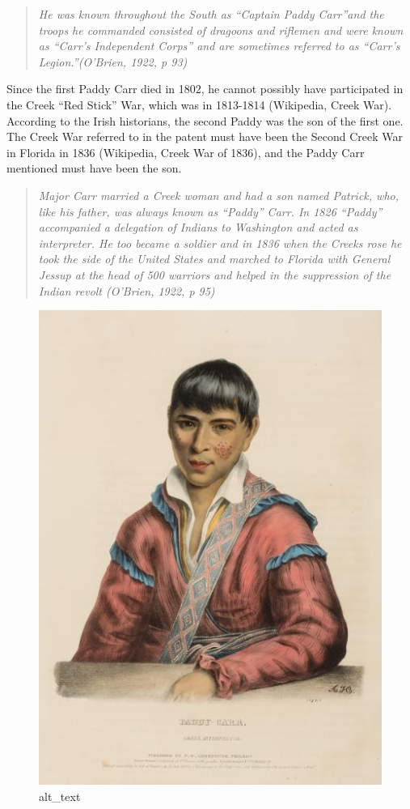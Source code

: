 \documentclass[
  12pt,
]{book}
\begin{document}
\begin{quote}
\emph{He was known throughout the South as ``Captain Paddy Carr''and the troops he commanded consisted of dragoons and riflemen and were known as ``Carr's Independent Corps'' and are sometimes referred to as ``Carr's Legion.''(O'Brien, 1922, p 93)}
\end{quote}

Since the first Paddy Carr died in 1802, he cannot possibly have participated in the Creek ``Red Stick'' War, which was in 1813-1814 (Wikipedia, Creek War). According to the Irish historians, the second Paddy was the son of the first one. The Creek War referred to in the patent must have been the Second Creek War in Florida in 1836 (Wikipedia, Creek War of 1836), and the Paddy Carr mentioned must have been the son.

\begin{quote}
\emph{Major Carr married a Creek woman and had a son named Patrick, who, like his father, was always known as ``Paddy'' Carr. In 1826 ``Paddy'' accompanied a delegation of Indians to Washington and acted as interpreter. He too became a soldier and in 1836 when the Creeks rose he took the side of the United States and marched to Florida with General Jessup at the head of 500 warriors and helped in the suppression of the Indian revolt (O'Brien, 1922, p 95)}
\end{quote}

\begin{figure}
\centering
\includegraphics{images/0202b_images/image1.jpg}
\caption{alt\_text}
\end{figure}
\end{document}
